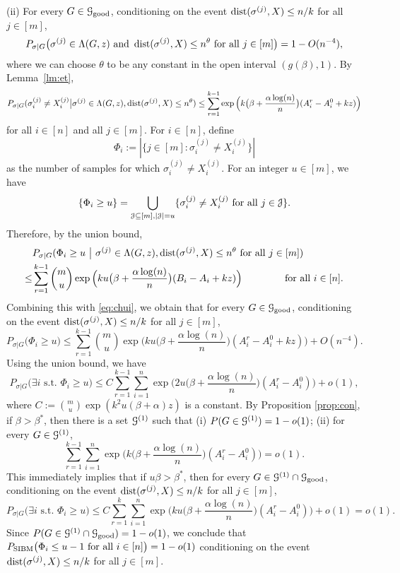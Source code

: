 \documentclass{article}
\begin{document}
\noindent (ii) For every $G\in\mathcal{G}_{\operatorname{good}}$, conditioning on the event $\operatorname{dist}(\sigma^{(j)}, X) \le n/k$ for all $j\in[m]$,
\begin{equation}  \label{eq:chui}
P_{\sigma|G} \big( \sigma^{(j)}\in  \Lambda(G, z)
\text{~and~} \operatorname{dist}(\sigma^{(j)}, X) \le n^\theta
\text{~for all~} j\in[m]  \big) 
=1- O(n^{-4}) ,
\end{equation}
where we can choose $\theta$ to be any constant in the open interval $(g(\beta), 1)$.
By Lemma~\ref{lm:et},
$$
P_{\sigma|G}(\sigma_i^{(j)} \neq X_i^{(j)} \big| \sigma^{(j)}\in \Lambda(G,z) ,\operatorname{dist}(\sigma^{(j)}, X) \le n^{\theta} ) 
\le \sum_{r=1}^{k-1} \exp\Big(k\big(\beta+\frac{\alpha\log(n)}{n} \big) (A^r_i-A^0_i + kz) \Big)
$$
for all $i\in[n]$ and all $j\in[m]$.
For $i\in[n]$, define 
$$
\Phi_i := |\{j\in[m]: \sigma_i^{(j)} \neq X_i^{(j)}\}|
$$
as the number of samples for which $\sigma_i^{(j)} \neq X_i^{(j)}$.
For an integer $u\in[m]$, we have
$$
\{\Phi_i \ge u\} =
\bigcup_{\mathcal{J}\subseteq[m], |\mathcal{J}|=u}
\{\sigma_i^{(j)} \neq X_i^{(j)} \text{~for all~} j\in \mathcal{J}\} .
$$
Therefore, by the union bound,
\begin{align*}
& P_{\sigma|G}( \Phi_i \ge u  ~\big|~  \sigma^{(j)}\in \Lambda(G,z) ,\operatorname{dist}(\sigma^{(j)}, X) \le n^{\theta} \text{~for all~} j\in[m] ) \\
\le & \sum_{r=1}^{k-1} \binom{m}{u} \exp\Big(ku\big(\beta+\frac{\alpha\log(n)}{n} \big) (B_i-A_i + kz) \Big)
\quad\quad\quad\quad\text{~for all~} i\in[n] .
\end{align*}
Combining this with \eqref{eq:chui}, we obtain that for every $G\in\mathcal{G}_{\operatorname{good}}$, conditioning on the event $\operatorname{dist}(\sigma^{(j)}, X) \le n/k$ for all $j\in[m]$,
$$
P_{\sigma|G} \big( \Phi_i \ge u \big) \le \sum_{r=1}^{k-1}\binom{m}{u} \exp\Big(ku \big(\beta+\frac{\alpha\log(n)}{n} \big) (A^r_i-A^0_i + kz) \Big) + O(n^{-4}).
$$
Using the union bound, we have
$$
P_{\sigma|G} \big(\exists i \text{~s.t.~} \Phi_i \ge u \big) \le 
C \sum_{r=1}^{k-1}\sum_{i=1}^n \exp\Big(2u \big(\beta+\frac{\alpha\log(n)}{n} \big) (A^r_i-A^0_i ) \Big) + o(1) ,
$$
where $C:=\binom{m}{u}\exp(k^2u(\beta+\alpha)z)$ is a constant.
By Proposition \ref{prop:con}, if $\beta>\beta^*$, then there is a set $\mathcal{G}^{(1)}$ such that (i) $P(G\in \mathcal{G}^{(1)})=1-o(1)$; (ii) for every $G\in\mathcal{G}^{(1)}$,
$$
\sum_{r=1}^{k-1}\sum_{i=1}^n \exp\Big(k \big(\beta+\frac{\alpha\log(n)}{n} \big) (A^r_i-A^0_i ) \Big) = o(1) .
$$
This immediately implies that if $u\beta>\beta^*$, then for every $G\in\mathcal{G}^{(1)}\cap\mathcal{G}_{\operatorname{good}}$, conditioning on the event $\operatorname{dist}(\sigma^{(j)}, X) \le n/k$ for all $j\in[m]$,
$$
P_{\sigma|G} \big(\exists i \text{~s.t.~} \Phi_i \ge u \big) \le 
C \sum_{r=1}^{k}\sum_{i=1}^n \exp\Big(ku \big(\beta+\frac{\alpha\log(n)}{n} \big) (A^r_i-A^0_i ) \Big) + o(1) =o(1).
$$
Since $P(G\in\mathcal{G}^{(1)}\cap\mathcal{G}_{\operatorname{good}})=1-o(1)$, we conclude that $P_{\operatorname{SIBM}} \big(\Phi_i \le u-1 \text{~for all~} i\in[n] \big)=1-o(1)$ conditioning on the event $\operatorname{dist}(\sigma^{(j)}, X) \le n/k$ for all $j\in[m]$.
\end{document}
